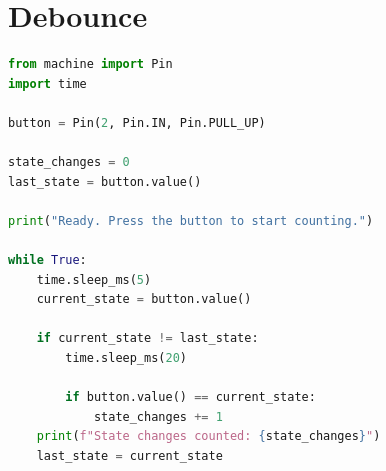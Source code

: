 \documentclass[12pt]{article}
\begin{document}
\section{Debounce}
\begin{lstlisting}[language=Python]
from machine import Pin
import time

button = Pin(2, Pin.IN, Pin.PULL_UP)

state_changes = 0
last_state = button.value()

print("Ready. Press the button to start counting.")

while True:
	time.sleep_ms(5)
	current_state = button.value()

	if current_state != last_state:
		time.sleep_ms(20)

		if button.value() == current_state:
			state_changes += 1
	print(f"State changes counted: {state_changes}")
	last_state = current_state
\end{lstlisting}
\end{document}
